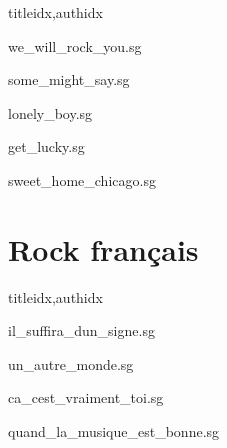 \documentclass[
    ]{article}
\begin{document}
\begin{songs}{titleidx,authidx}

{we_will_rock_you.sg}


{some_might_say.sg}


{lonely_boy.sg}


{get_lucky.sg}


{sweet_home_chicago.sg}

\end{songs}

\section{Rock français}

\begin{songs}{titleidx,authidx}

{il_suffira_dun_signe.sg}


{un_autre_monde.sg}


{ca_cest_vraiment_toi.sg}


{quand_la_musique_est_bonne.sg}

\end{songs}
\end{document}
